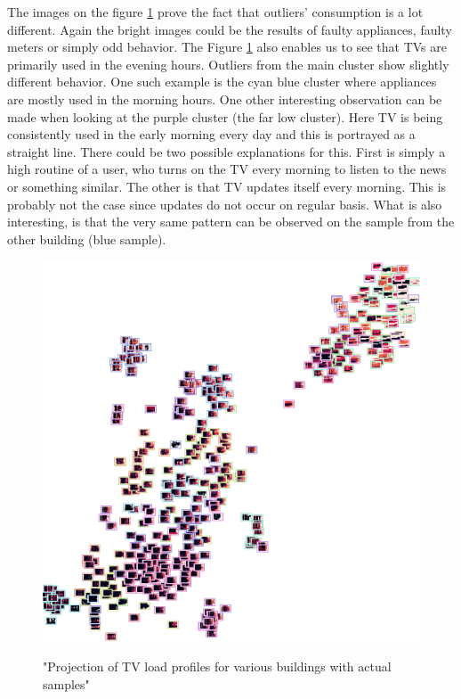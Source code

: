 The images on the figure \ref{fig:tsne_pa_img_scatter_all_tv} prove the fact that outliers' consumption is a lot different.
Again the bright images could be the results of faulty appliances, faulty meters or simply odd behavior.
The Figure \ref{fig:tsne_pa_img_scatter_all_tv} also enables us to see that TVs are primarily used 
in the evening hours. Outliers from the main cluster show slightly different behavior. One such 
example is the cyan blue cluster where appliances are mostly used in the morning hours. 
One other interesting observation can be made when looking at the purple cluster (the far low cluster).
Here TV is being consistently used in the early morning every day and this is portrayed as a straight line.
There could be two possible explanations for this.
First is simply a high routine of a user, who turns on the TV every morning to listen to the news or something similar.
The other is that TV updates itself every morning. This is probably not the case since updates do not occur on regular basis.
What is also interesting, is that the very same pattern can be observed on the sample from the other building (blue sample).

\begin{figure}[H]
	\centering
	\caption{"Projection of TV load profiles for various buildings with actual samples"}
	\includegraphics[width=.9\textwidth]{Figures/TSNE/TSNE_per_appliance/all/img_scatter_alltelevision.png}
	\label{fig:tsne_pa_img_scatter_all_tv}
\end{figure}

